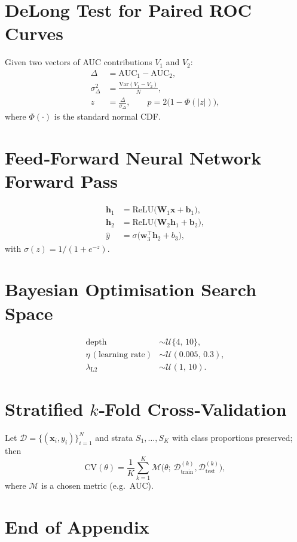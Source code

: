 \documentclass[12pt]{article}
\begin{document}
\section{DeLong Test for Paired ROC Curves}
Given two vectors of AUC contributions $V_1$ and $V_2$:
\begin{align}
  \Delta &= \text{AUC}_1 - \text{AUC}_2,\\[4pt]
  \sigma^{2}_{\Delta} &= \frac{\mathrm{Var}(V_1 - V_2)}{N},\\[4pt]
  z &= \frac{\Delta}{\sigma_{\Delta}}, \qquad p = 2\bigl(1-\Phi(|z|)\bigr),
\end{align}
where $\Phi(\cdot)$ is the standard normal CDF.

\section{Feed‑Forward Neural Network Forward Pass}
\begin{align}
  \bm{h}_1 &= \text{ReLU}\bigl(\bm{W}_1 \bm{x} + \bm{b}_1\bigr),\\[4pt]
  \bm{h}_2 &= \text{ReLU}\bigl(\bm{W}_2 \bm{h}_1 + \bm{b}_2\bigr),\\[4pt]
  \hat{y} &= \sigma\bigl(\bm{w}_3^{\top} \bm{h}_2 + b_3\bigr),
\end{align}
with $\sigma(z)=1/(1+e^{-z})$.

\section{Bayesian Optimisation Search Space}
\begin{align}
  \text{depth} &\sim \mathcal{U}\{4,\,10\},\\[4pt]
  \eta\, (\text{learning rate}) &\sim \mathcal{U}(0.005,\,0.3),\\[4pt]
  \lambda_{\text{L2}} &\sim \mathcal{U}(1,\,10).
\end{align}

\section{Stratified $k$‑Fold Cross‑Validation}
Let $\mathcal{D}=\{(\bm{x}_i,y_i)\}_{i=1}^{N}$ and strata $S_1,\ldots,S_K$ with class proportions preserved; then
\begin{equation}
  \text{CV}(\theta) = \frac{1}{K}\sum_{k=1}^{K} \mathcal{M}\bigl(\theta;\,\mathcal{D}_{\text{train}}^{(k)},\mathcal{D}_{\text{test}}^{(k)}\bigr),
\end{equation}
where $\mathcal{M}$ is a chosen metric (e.g.~AUC).

\section*{End of Appendix}
\end{document}
